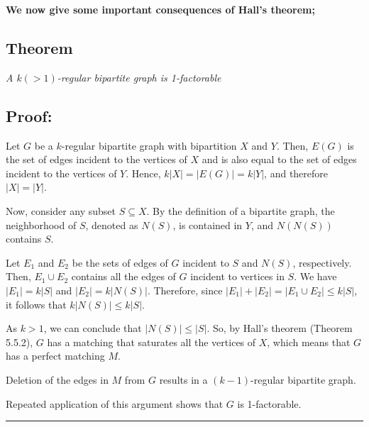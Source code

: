 \documentclass[a4paper,12pt]{report}
\begin{document}
	\vspace{1cm}
	  \textbf{ We now give some important consequences of Hall’s theorem;}
	    \hfill
		\subsection*{Theorem}
		
		\textit{A $k(>1)$-regular bipartite graph is 1-factorable}
		
		\subsection*{Proof:}
		Let $G$ be a $k$-regular bipartite graph with bipartition $X$ and $Y$. Then, $E(G)$ is the set of edges incident to the vertices of $X$ and is also equal to the set of edges incident to the vertices of $Y$. Hence, $k|X| = |E(G)| = k|Y|$, and therefore $|X| = |Y|$. 
		
		Now, consider any subset $S \subseteq X$. By the definition of a bipartite graph, the neighborhood of $S$, denoted as $N(S)$, is contained in $Y$, and $N(N(S))$ contains $S$. 
		
		Let $E_1$ and $E_2$ be the sets of edges of $G$ incident to $S$ and $N(S)$, respectively. Then, $E_1 \cup E_2$ contains all the edges of $G$ incident to vertices in $S$. We have $|E_1| = k|S|$ and $|E_2| = k|N(S)|$. Therefore, since $|E_1| + |E_2| = |E_1 \cup E_2| \leq k|S|$, it follows that $k|N(S)| \leq k|S|$. 
		
		As $k > 1$, we can conclude that $|N(S)| \leq |S|$. So, by Hall's theorem (Theorem 5.5.2), $G$ has a matching that saturates all the vertices of $X$, which means that $G$ has a perfect matching $M$. 
		
		Deletion of the edges in $M$ from $G$ results in a $(k - 1)$-regular bipartite graph. 
		
		Repeated application of this argument shows that $G$ is 1-factorable.
	
	\begin{center}
		\rule{\textwidth}{1.5pt}
	\end{center}

  
  
   
\end{document}
